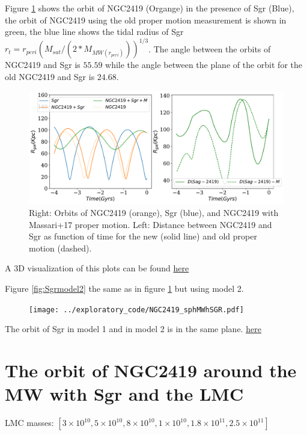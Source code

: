 \documentclass[14pt]{article}
\begin{document}
Figure \ref{fig:Sgrmodel1} shows the orbit of NGC2419 (Organge) in the
presence of Sgr (Blue), the orbit of NGC2419 using the old proper
motion measurement is shown in green, the blue line shows the tidal
radius of Sgr $r_t = r_{peri} (M_{sat}/(2*M_{MW(r_{peri})}))^{1/3}$.
The angle between the orbits of NGC2419 and Sgr is $55.59$ while the
angle between the plane of the orbit for the old NGC2419  and Sgr is
$24.68$.

\begin{figure}[H]
\centering
\includegraphics[scale=0.5]{../exploratory_code/NGC2419_sphMWSGR.pdf}
\caption{Right: Orbits of NGC2419 (orange), Sgr (blue), and NGC2419
with Massari+17 proper motion. Left: Distance between NGC2419 and Sgr
as function of time for the new (solid line) and old proper motion
(dashed). \label{fig:Sgrmodel1}}
\end{figure}

A 3D visualization of this plots can be found \href{https://plot.ly/~jngc/22/orbits/}{here}

Figure \ref{fig:Sgrmodel2} the same as in figure \ref{fig:Sgrmodel1}
but using model 2.

\begin{figure}[H]
\centering
\texttt{[image: ../exploratory\_code/NGC2419\_sphMWhSGR.pdf]}
\caption{\label{fig:Sgrmmodel2}}
\end{figure}

The orbit of Sgr in model 1 and in model 2 is in the same plane.
\href{https://plot.ly/~jngc/25/orbits/}{here}



\section{The orbit of NGC2419 around the MW with Sgr and the
LMC}\label{sec:NGCSgrLMC}

LMC masses: $[3\times10^{10}, 5\times10^{10}, 8\times10^{10},
1\times10^{10}, 1.8\times10^{11}, 2.5\times10^{11}]$
\end{document}
